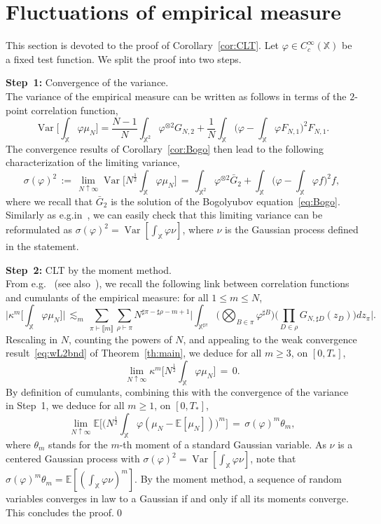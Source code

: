 \documentclass[a4paper,11pt,reqno,noindent]{amsart}
\theoremstyle{plain}
\theoremstyle{definition}
\numberwithin{equation}{section}
\newcommand{\Xd}{\mathbb X}
\newcommand{\E}{\mathbb{E}}
\newcommand{\Var}{\operatorname{Var}}
\begin{document}
\section{Fluctuations of empirical measure}
This section is devoted to the proof of Corollary~\ref{cor:CLT}.
Let $\varphi\in C^\infty_c(\Xd)$ be a fixed test function. We split the proof into two steps.

\medskip\noindent
{\bf Step~1:} Convergence of the variance.\\
The variance of the empirical measure can be written as follows in terms of the $2$-point correlation function,
\[\Var\bigg[\int_\Xd\varphi\mu_N\bigg]=\frac{N-1}N\int_{\Xd^2}\varphi^{\otimes2}G_{N,2}+\frac1N\int_\Xd\Big(\varphi-\int_\Xd\varphi F_{N,1}\Big)^2F_{N,1}.\]
The convergence results of Corollary~\ref{cor:Bogo} then lead to the following characterization of the limiting variance,
\[\sigma(\varphi)^2\,:=\,\lim_{N\uparrow\infty}\Var\bigg[N^\frac12\int_\Xd\varphi\mu_N\bigg]\,=\,\int_{\Xd^2}\varphi^{\otimes2}\bar G_2+\int_\Xd\Big(\varphi-\int_\Xd\varphi f\Big)^2f,\]
where we recall that $\bar G_2$ is the solution of the Bogolyubov equation~\eqref{eq:Bogo}.
Similarly as e.g.\@ in~\cite[Section~5]{BD_2024}, we can easily check that this limiting variance can be reformulated as $\sigma(\varphi)^2=\Var[\int_\Xd\varphi\nu]$, where $\nu$ is the Gaussian process defined in the statement.

\medskip\noindent
{\bf Step~2:} CLT by the moment method.\\
From e.g.~\cite[Proposition~4.1]{D-21} (see also~\cite[Lemma~2.6]{BD_2024}), we recall the following link between correlation functions and cumulants of the empirical measure: for all $1\le m\le N$,
\begin{equation*}
\bigg|\kappa^m\bigg[\int_{\Xd}\varphi \mu_N\bigg]\bigg|
\,\lesssim_m\,\sum_{\pi\vdash\llbracket m\rrbracket}\sum_{\rho\vdash\pi}N^{\sharp\pi-\sharp\rho-m+1}\bigg|\int_{\Xd^{\sharp\pi}}\Big(\bigotimes_{B\in\pi}\varphi^{\sharp B}\Big)\Big(\prod_{D\in\rho}G_{N,\sharp D}(z_D)\Big)dz_\pi\bigg|.
\end{equation*}
Rescaling in $N$, counting the powers of $N$, and appealing to the weak convergence result~\eqref{eq:wL2bnd} of Theorem~\ref{th:main}, we deduce for all $m\ge3$, on $[0,T_*]$,
\[\lim_{N\uparrow\infty}\kappa^m\bigg[N^\frac12\int_{\Xd}\varphi \mu_N\bigg]\,=\,0.\]
By definition of cumulants, combining this with the convergence of the variance in Step~1, we deduce for all $m\ge1$, on $[0,T_*]$,
\[\lim_{N\uparrow\infty}\E\bigg[\Big(N^\frac12\int_{\Xd}\varphi (\mu_N-\E[\mu_N])\Big)^m\bigg]\,=\,\sigma(\varphi)^m\theta_m,\]
where $\theta_m$ stands for the $m$-th moment of a standard Gaussian variable. As $\nu$ is a centered Gaussian process with $\sigma(\varphi)^2=\Var[\int_\Xd\varphi\nu]$, note that $\sigma(\varphi)^m\theta_m=\E[(\int_\Xd\varphi\nu)^m]$.
By the moment method, a sequence of random variables converges in law to a Gaussian if and only if all its moments converge. This concludes the proof.\qed
\end{document}
